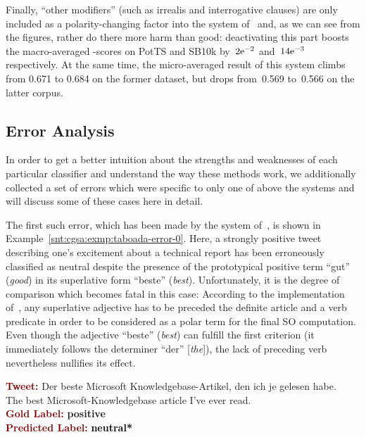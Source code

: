 Finally, ``other modifiers'' (such as irrealis and interrogative
clauses) are only included as a polarity-changing factor into the
system of~\citet{Taboada:11} and, as we can see from the figures,
rather do there more harm than good: deactivating this part boosts the
macro-averaged \F{}-scores on PotTS and SB10k by~${2}\mathrm{e}^{-2}$
and~${14}\mathrm{e}^{-3}$ respectively.  At the same time, the
micro-averaged result of this system climbs from 0.671 to 0.684 on the
former dataset, but drops from~0.569 to~0.566 on the latter corpus.

\subsection{Error Analysis}\label{subsec:cgsa:lex-methods:err-analysis}

In order to get a better intuition about the strengths and weaknesses
of each particular classifier and understand the way these methods
work, we additionally collected a set of errors which were specific to
only one of above the systems and will discuss some of these cases
here in detail.

The first such error, which has been made by the system
of~\citet{Taboada:11}, is shown in
Example~\ref{snt:cgsa:exmp:taboada-error-0}.  Here, a strongly
positive tweet describing one's excitement about a technical report
has been erroneously classified as neutral despite the presence of the
prototypical positive term ``gut'' (\emph{good}) in its superlative
form ``beste'' (\emph{best}).  Unfortunately, it is the degree of
comparison which becomes fatal in this case: According to the
implementation of~\citet{Taboada:11}, any superlative adjective has to
be preceded the definite article and a verb predicate in order to be
considered as a polar term for the final SO computation.  Even though
the adjective ``beste'' (\emph{best}) can fulfill the first criterion
(it immediately follows the determiner ``der'' [\emph{the}]), the lack
of preceding verb nevertheless nullifies its effect.

\begin{example}\label{snt:cgsa:exmp:taboada-error-0}
  \noindent\textup{\bfseries\textcolor{darkred}{Tweet:}} {\upshape Der beste Microsoft Knowledgebase-Artikel, den ich je gelesen habe.}\\
  \noindent The best Microsoft-Knowledgebase article I've ever read.\\[\exampleSep]
  \noindent\textup{\bfseries\textcolor{darkred}{Gold Label:}}\hspace*{4.3em}\textbf{%
    \upshape\textcolor{green3}{positive}}\\
 \noindent\textup{\bfseries\textcolor{darkred}{Predicted Label:}}\hspace*{2em}\textbf{%
    \upshape\textcolor{black}{neutral*}}
\end{example}

